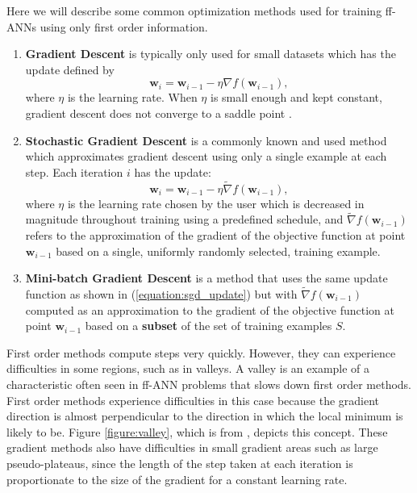\documentclass[letterpaper,12pt,titlepage,oneside,final]{book}
\begin{document}
	Here we will describe some common optimization methods used for training ff-ANNs using only first order information. 
	\begin{enumerate}
		\item {\textbf{Gradient Descent} is typically only used for small datasets which has the update defined by 
			\begin{equation}
			\mathbf{w}_{i} = \mathbf{w}_{i-1} - \eta{\nabla}{f(\mathbf{w}_{i-1})},
			\label{equation:gd_update}
			\end{equation}
			where $\eta$ is the learning rate. When $\eta$ is small enough and kept constant, gradient descent does not converge to a saddle point \cite{gd_converges.paper}.
		}
		\item{\textbf{Stochastic Gradient Descent} is a commonly known and used method which approximates gradient descent using only a single example at each step. Each iteration $i$ has the update:
			\begin{equation}
			\mathbf{w}_{i} = \mathbf{w}_{i-1} - \eta\widetilde{\nabla}{f(\mathbf{w}_{i-1})},
			\label{equation:sgd_update}
			\end{equation}
			where $\eta$ is the learning rate chosen by the user which is decreased in magnitude throughout training using a predefined schedule, and $\widetilde{\nabla}{f(\mathbf{w}_{i-1})}$ refers to the approximation of the gradient of the objective function at point $\mathbf{w}_{i-1}$ based on a single, uniformly randomly selected, training example. 
		}   
		\item{\textbf{Mini-batch Gradient Descent} is a method that uses the same update function as shown in (\ref{equation:sgd_update}) but with $\widetilde{\nabla}{f(\mathbf{w}_{i-1})}$ computed as an approximation to the gradient of the objective function at point $\mathbf{w}_{i-1}$ based on a \textbf{subset} of the set of training examples $S$.}
	\end{enumerate}
	First order methods compute steps very quickly. However, they can experience difficulties in some regions, such as in valleys. A valley is an example of a characteristic often seen in ff-ANN problems \cite{Shepherd.1997} that slows down first order methods. First order methods experience difficulties in this case because the gradient direction is almost perpendicular to the direction in which the local minimum is likely to be. Figure \ref{figure:valley}, which is from \cite{martens2010deep}, depicts this concept. These gradient methods also have difficulties in small gradient areas such as large pseudo-plateaus, since the length of the step taken at each iteration is proportionate to the size of the gradient for a constant learning rate.
	
\end{document}
